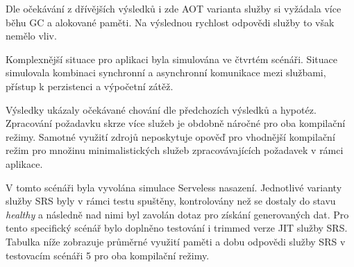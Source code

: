 
Dle očekávání z dřívějších výsledků i zde AOT varianta služby si vyžádala více běhu GC a alokované paměti. Na výslednou rychlost odpovědi služby to však nemělo vliv.


Komplexnější situace pro aplikaci byla simulována ve čtvrtém scénáři. Situace simulovala kombinaci synchronní a asynchronní komunikace mezi službami, přístup k perzistenci a výpočetní zátěž. 


Výsledky ukázaly očekávané chování dle předchozích výsledků a hypotéz. Zpracování požadavku skrze více služeb je obdobně náročné pro oba kompilační režimy. Samotné využití zdrojů neposkytuje opověď pro vhodnější kompilační režim pro množinu minimalistických služeb zpracovávajících požadavek v rámci aplikace.


V tomto scénáři byla vyvolána simulace Serveless nasazení. Jednotlivé varianty služby SRS byly v rámci testu spuštěny, kontrolovány než se dostaly do stavu \emph{healthy} a následně nad nimi byl zavolán dotaz pro získání generovaných dat. Pro tento specifický scénář bylo doplněno testování i trimmed verze JIT služby SRS. Tabulka níže zobrazuje průměrné využití paměti a dobu odpovědi služby SRS v testovacím scénáři 5 pro oba kompilační režimy. 


